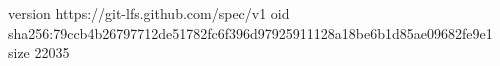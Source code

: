 version https://git-lfs.github.com/spec/v1
oid sha256:79ccb4b26797712de51782fc6f396d97925911128a18be6b1d85ae09682fe9e1
size 22035
